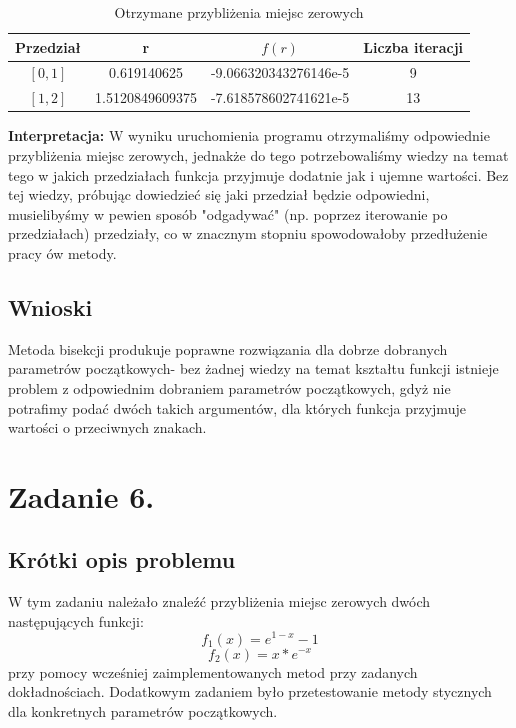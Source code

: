 \documentclass[a4paper,14pt]{report}
\begin{document}
    \begin{table}[H]
    \centering
    \begin{tabular}{|c | c | c | c |} 
     \hline
     Przedział & r & $f(r)$ & Liczba iteracji \\ [0.5ex] 
     \hline\hline
     $[0,1]$ & 0.619140625 & -9.066320343276146e-5 & 9  \\ 
     $[1,2]$ & 1.5120849609375 & -7.618578602741621e-5 & 13 \\
     \hline
    \end{tabular}
    \caption{Otrzymane przybliżenia miejsc zerowych}
    \label{Zad5Wyniki}
    \end{table}
    \textbf{Interpretacja: } W wyniku uruchomienia programu otrzymaliśmy odpowiednie przybliżenia miejsc zerowych, jednakże do tego potrzebowaliśmy wiedzy na temat tego w jakich przedziałach funkcja przyjmuje dodatnie jak i ujemne wartości. Bez tej wiedzy, próbując dowiedzieć się jaki przedział będzie odpowiedni, musielibyśmy w pewien sposób "odgadywać" (np. poprzez iterowanie po przedziałach) przedziały, co w znacznym stopniu spowodowałoby przedłużenie pracy ów metody.
  \section{Wnioski}
    Metoda bisekcji produkuje poprawne rozwiązania dla dobrze dobranych parametrów początkowych- bez żadnej wiedzy na temat kształtu funkcji istnieje problem z odpowiednim dobraniem parametrów początkowych, gdyż nie potrafimy podać dwóch takich argumentów, dla których funkcja przyjmuje wartości o przeciwnych znakach.
\chapter{Zadanie 6.}
  \section{Krótki opis problemu}
    W tym zadaniu należało znaleźć przybliżenia miejsc zerowych dwóch następujących funkcji:
    \begin{equation}
    f_{1}(x)=e^{1-x}-1
    \end{equation}
    \begin{equation}
    f_{2}(x)=x*e^{-x}
    \end{equation}
    przy pomocy wcześniej zaimplementowanych metod przy zadanych dokładnościach. Dodatkowym zadaniem było przetestowanie metody stycznych dla konkretnych parametrów początkowych.
\end{document}
